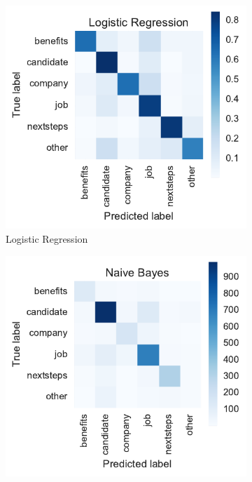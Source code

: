 \begin{figure}[h]
    \centering
    \begin{subfigure}[b]{0.32\textwidth}
        \includegraphics[width=\textwidth]{img/exp-vector-space-conf-matrix-ngram-logreg-normalized.pdf}
        \caption{Logistic Regression}
        \label{fig:exp-vector-space-conf-matrix-ngram-logreg-normalized}
    \end{subfigure}
    \begin{subfigure}[b]{0.32\textwidth}
        \includegraphics[width=\textwidth]{img/exp-vector-space-conf-matrix-ngram-naivebayes-normalized.pdf}

\end{subfigure}
\end{figure}
